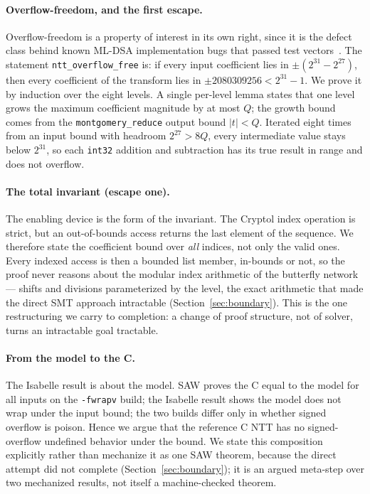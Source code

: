 \documentclass[11pt]{article}
\newcommand{\code}[1]{\texttt{#1}}
\begin{document}
\paragraph{Overflow-freedom, and the first escape.} Overflow-freedom is a property of interest in its own
right, since it is the defect class behind known ML-DSA
implementation bugs that passed test vectors~\cite{eprint1032}. The statement \code{ntt\_overflow\_free}
is: if every input coefficient lies in $\pm(2^{31} - 2^{27})$, then every coefficient of the transform
lies in $\pm 2080309256 < 2^{31} - 1$. We prove it by induction over the eight levels. A single per-level
lemma states that one level grows the maximum coefficient magnitude by at most $Q$; the growth bound
comes from the \code{montgomery\_reduce} output bound $|t| < Q$. Iterated eight times from an input bound
with headroom $2^{27} > 8Q$, every intermediate value stays below $2^{31}$, so each \code{int32}
addition and subtraction has its true result in range and does not overflow.

\paragraph{The total invariant (escape one).} The enabling device is the form of the invariant. The
Cryptol index operation is strict, but an out-of-bounds access returns the last element of the sequence.
We therefore state the coefficient bound over \emph{all} indices, not only the valid ones. Every indexed
access is then a bounded list member, in-bounds or not, so the proof never reasons about the modular
index arithmetic of the butterfly network --- shifts and divisions parameterized by the level, the exact
arithmetic that made the direct SMT approach intractable (Section~\ref{sec:boundary}). This is the one
restructuring we carry to completion: a change of proof structure, not of solver, turns an intractable
goal tractable.

\paragraph{From the model to the C.} The Isabelle result is about the model. SAW proves the C equal to
the model for all inputs on the \code{-fwrapv} build; the Isabelle result shows the model does not wrap
under the input bound; the two builds differ only in whether signed overflow is poison. Hence we argue that the
reference C NTT has no signed-overflow undefined behavior under the bound. We state this composition
explicitly rather than mechanize it as one SAW theorem, because the direct attempt did not complete
(Section~\ref{sec:boundary}); it is an argued meta-step over two mechanized results, not itself a machine-checked theorem.
\end{document}

